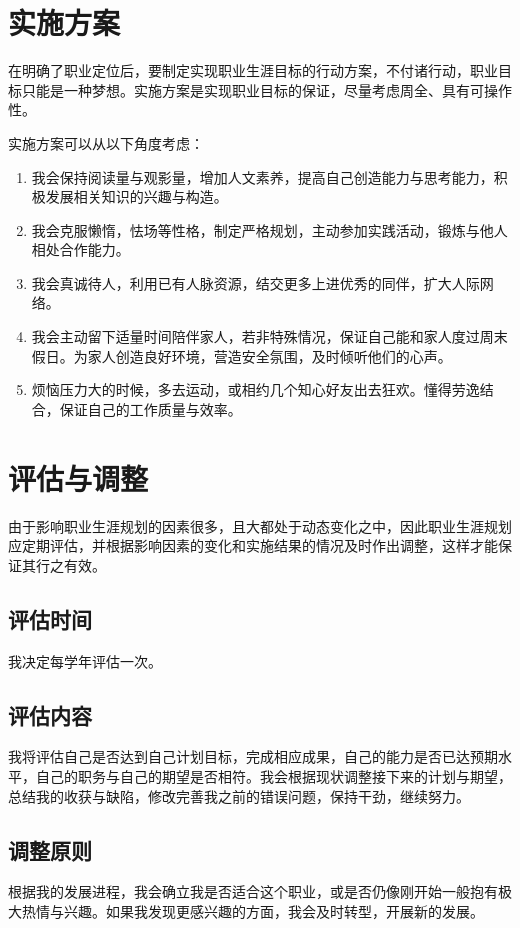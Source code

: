 \documentclass{article}
\begin{document}
\section{实施方案}
在明确了职业定位后，要制定实现职业生涯目标的行动方案，不付诸行动，职业目标只能是一种梦想。实施方案是实现职业目标的保证，尽量考虑周全、具有可操作性。\par
实施方案可以从以下角度考虑：\par
\begin{enumerate}[I]
	\item 我会保持阅读量与观影量，增加人文素养，提高自己创造能力与思考能力，积极发展相关知识的兴趣与构造。
	\item 我会克服懒惰，怯场等性格，制定严格规划，主动参加实践活动，锻炼与他人相处合作能力。
	\item 我会真诚待人，利用已有人脉资源，结交更多上进优秀的同伴，扩大人际网络。
	\item 我会主动留下适量时间陪伴家人，若非特殊情况，保证自己能和家人度过周末假日。为家人创造良好环境，营造安全氛围，及时倾听他们的心声。
	\item 烦恼压力大的时候，多去运动，或相约几个知心好友出去狂欢。懂得劳逸结合，保证自己的工作质量与效率。
\end{enumerate}
\par 
\section{评估与调整}
由于影响职业生涯规划的因素很多，且大都处于动态变化之中，因此职业生涯规划应定期评估，并根据影响因素的变化和实施结果的情况及时作出调整，这样才能保证其行之有效。\par 
\subsection{评估时间}
我决定每学年评估一次。\par
\subsection{评估内容}
我将评估自己是否达到自己计划目标，完成相应成果，自己的能力是否已达预期水平，自己的职务与自己的期望是否相符。我会根据现状调整接下来的计划与期望，总结我的收获与缺陷，修改完善我之前的错误问题，保持干劲，继续努力。\par
\subsection{调整原则}
根据我的发展进程，我会确立我是否适合这个职业，或是否仍像刚开始一般抱有极大热情与兴趣。如果我发现更感兴趣的方面，我会及时转型，开展新的发展。\par
\end{document}
